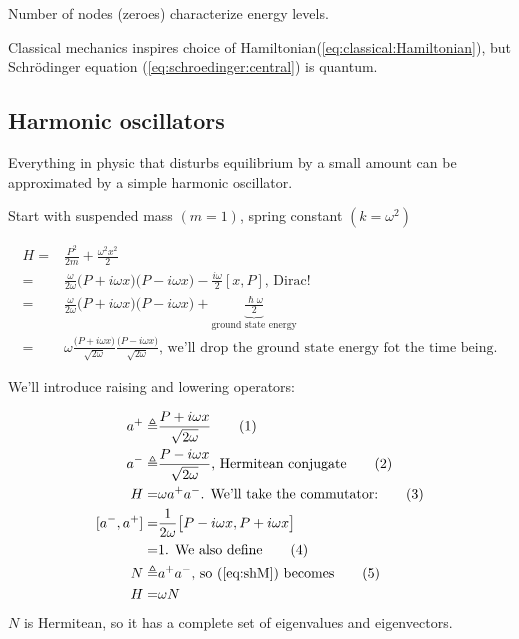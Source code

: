 \documentclass[]{article}
\newcommand\numberthis{\addtocounter{equation}{1}\tag{\theequation}}
\begin{document}
Number of nodes (zeroes) characterize energy levels.

Classical mechanics inspires choice of Hamiltonian(\ref{eq:classical:Hamiltonian}), but Schr\"odinger equation (\ref{eq:schroedinger:central}) is quantum.

\subsection{Harmonic oscillators}

Everything in physic that disturbs equilibrium by a small amount can be approximated by a simple harmonic oscillator. 

Start with suspended mass $(m=1)$, spring constant $(k=\omega^2)$

\begin{align*}
H =& \frac{P^2}{2m} + \frac{\omega^2 x^2}{2}\\
=& \frac{\omega}{2 \omega}\big(P + i \omega x \big)\big(P - i \omega x \big) - \frac{i \omega}{2} [x,P] \text{, Dirac!}\\
=& \frac{\omega}{2 \omega}\big(P + i \omega x \big)\big(P - i \omega x \big) + \underbrace{\frac{\hslash \omega}{2}}_\text{ground state energy}\\
=&\omega \frac{\big(P + i \omega x \big)}{\sqrt{2 \omega}}\frac{\big(P - i \omega x \big)}{\sqrt{2 \omega}}\text{, we'll drop the ground state energy fot the time being.}
\end{align*}

We'll introduce raising and lowering operators:

\begin{align*}
a^+ \triangleq & \frac{P + i \omega x } {\sqrt{2 \omega}} \numberthis \label{eq:creation:operator}\\
a^- \triangleq & \frac{P - i \omega x } {\sqrt{2 \omega}}\text{, Hermitean conjugate} \numberthis \label{eq:annihilation:operator}\\
H =& \omega a^+ a^-\text{. We'll take the commutator:}\numberthis \label{eq:shM}\\
[a^-,a^+] =& \frac{1}{2\omega}\big[P - i \omega x,P + i \omega x\big]\\
=& 1\text{. We also define} \numberthis \label{eq:a:comm}\\
N \triangleq& a^+a^-\text{, so (\ref{eq:shM}) becomes} \numberthis \label{eq:number:operator}\\
H =& \omega N
\end{align*}
$N$ is Hermitean, so it has a complete set of eigenvalues and eigenvectors.
\end{document}
